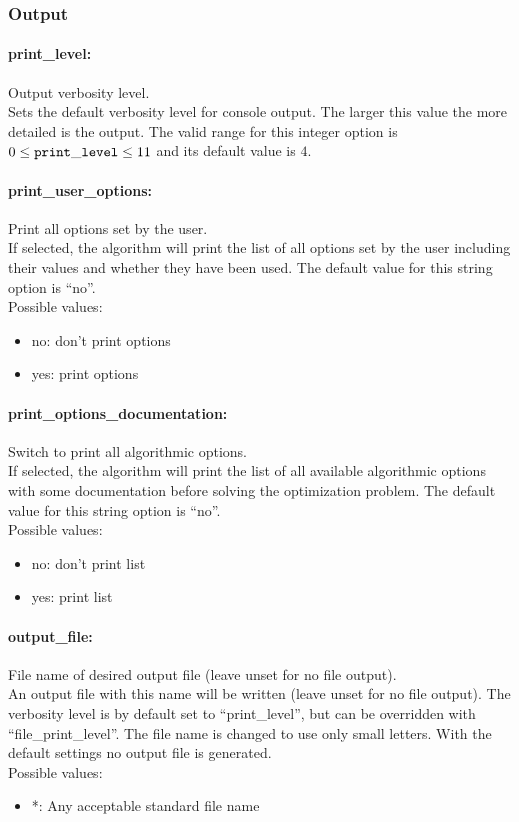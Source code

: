 \subsubsection{Output}

\paragraph{print\_level:} Output verbosity level. $\;$ \\
 Sets the default verbosity level for console
output. The larger this value the more detailed
is the output. The valid range for this integer option is
$0 \le {\tt print\_level } \le 11$
and its default value is $4$.


\paragraph{print\_user\_options:} Print all options set by the user. $\;$ \\
 If selected, the algorithm will print the list of
all options set by the user including their
values and whether they have been used.
The default value for this string option is ``no''.
\\ 
Possible values:
\begin{itemize}
   \item no: don't print options
   \item yes: print options
\end{itemize}

\paragraph{print\_options\_documentation:} Switch to print all algorithmic options. $\;$ \\
 If selected, the algorithm will print the list of
all available algorithmic options with some
documentation before solving the optimization
problem.
The default value for this string option is ``no''.
\\ 
Possible values:
\begin{itemize}
   \item no: don't print list
   \item yes: print list
\end{itemize}

\paragraph{output\_file:} File name of desired output file (leave unset for no file output). $\;$ \\
An output file with this
name will be written (leave unset for no file
output).  The verbosity level is by default set
to ``print\_level'', but can be overridden with
``file\_print\_level''.  The file name is changed
to use only small letters.
With the default settings no output file is generated.
\\ 
Possible values:
\begin{itemize}
   \item *: Any acceptable standard file name
\end{itemize}

